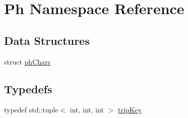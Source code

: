 \hypertarget{namespacePh}{}\section{Ph Namespace Reference}
\label{namespacePh}
\subsection*{Data Structures}
\begin{DoxyCompactItemize}
\item 
struct \mbox{\hyperlink{structPh_1_1phChars}{ph\+Chars}}
\end{DoxyCompactItemize}
\subsection*{Typedefs}
\begin{DoxyCompactItemize}
\item 
typedef std\+::tuple$<$ int, int, int $>$ \mbox{\hyperlink{namespacePh_afdd5bf3d7b37625115089ea3048e0cbb}{trip\+Key}}
\end{DoxyCompactItemize}
